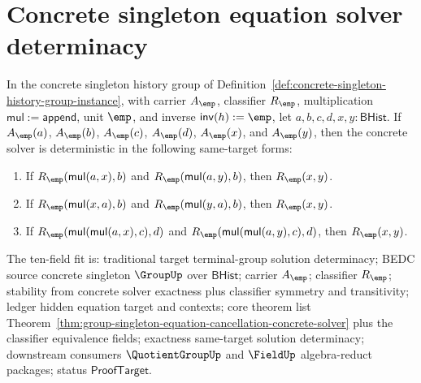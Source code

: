 \section{Concrete singleton equation solver determinacy}
\label{sec:group-singleton-equation-solver-determinacy}

\begin{theorem}
\label{thm:group-singleton-equation-solver-determinacy}
In the concrete singleton history group of
Definition~\ref{def:concrete-singleton-history-group-instance}, with carrier
$A_{\emp}$, classifier $R_{\emp}$, multiplication
$\mathsf{mul}:=\mathsf{append}$, unit $\emp$, and inverse
$\mathsf{inv}(h):=\emp$, let $a,b,c,d,x,y:\mathsf{BHist}$. If
$A_{\emp}(a)$, $A_{\emp}(b)$, $A_{\emp}(c)$, $A_{\emp}(d)$, $A_{\emp}(x)$,
and $A_{\emp}(y)$, then the concrete solver is deterministic in the following
same-target forms:
\begin{enumerate}
  \item If $R_{\emp}(\mathsf{mul}(a,x),b)$ and
  $R_{\emp}(\mathsf{mul}(a,y),b)$, then $R_{\emp}(x,y)$.

  \item If $R_{\emp}(\mathsf{mul}(x,a),b)$ and
  $R_{\emp}(\mathsf{mul}(y,a),b)$, then $R_{\emp}(x,y)$.

  \item If $R_{\emp}(\mathsf{mul}(\mathsf{mul}(a,x),c),d)$ and
  $R_{\emp}(\mathsf{mul}(\mathsf{mul}(a,y),c),d)$, then $R_{\emp}(x,y)$.
\end{enumerate}
The ten-field fit is: traditional target terminal-group solution determinacy;
BEDC source concrete singleton $\GroupUp$ over $\mathsf{BHist}$; carrier
$A_{\emp}$; classifier $R_{\emp}$; stability from concrete solver exactness plus
classifier symmetry and transitivity; ledger hidden equation target and
contexts; core theorem list
Theorem~\ref{thm:group-singleton-equation-cancellation-concrete-solver} plus
the classifier equivalence fields; exactness same-target solution determinacy;
downstream consumers $\QuotientGroupUp$ and $\FieldUp$ algebra-reduct packages;
status $\mathsf{ProofTarget}$.
\end{theorem}
